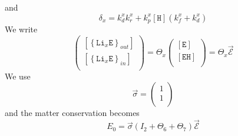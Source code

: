\documentclass[aps,onecolumn,11pt]{revtex4}
\newcommand{\mychem}[1]{\mathtt{#1}}
\newcommand{\myconc}[1]{\left\lbrack{#1}\right\rbrack}
\newcommand{\LiEin}[1]{\myconc{\left\lbrace\mychem{Li}_{#1}\mychem{E}\right\rbrace_{in}}}
\newcommand{\LiEout}[1]{\myconc{\left\lbrace\mychem{Li}_{#1}\mychem{E}\right\rbrace_{out}}}
\newcommand{\EHin}{\myconc{\mychem{EH}}}
\newcommand{\Eout}{\myconc{\mychem{E}}}
\newcommand{\Hin}{\myconc{\mychem{H}}}
\begin{document}
and
\begin{equation}
\delta_x = k_d^x k_r^x + k_p^x \Hin \left(k_f^x+k_d^x\right)
\end{equation}
We write
\begin{equation}
	\begin{pmatrix}
	\LiEout{x}\\
	\LiEin{x}\\
\end{pmatrix}
= 
\Theta_x 
\begin{pmatrix}
	\Eout\\
	\EHin\\
\end{pmatrix}
=\Theta_x \vec{\mathcal{E}}
\end{equation}
We use 
\begin{equation}
	\vec{\sigma} = 
	\begin{pmatrix}
	1\\
	1\\
	\end{pmatrix}
\end{equation}
and the matter conservation becomes
\begin{equation}
	E_0 = \vec{\sigma}\left(I_2+\Theta_6+\Theta_7\right) \vec{\mathcal{E}}
\end{equation}
\end{document}
